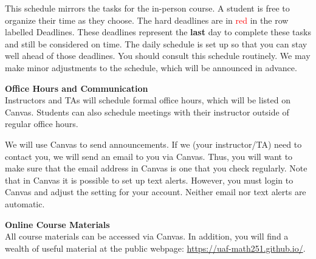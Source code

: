 \documentclass[12pt]{article}
\renewcommand{\emph}[1]{\textsf{\textbf{#1}}}
\newcommand{\localhead}[1]{\par\smallskip\textbf{#1}\nobreak\\}%
\def\heading#1{\localhead{\large\emph{#1}}}
\begin{document}
This schedule mirrors the tasks for the
in-person course. A student is free to organize their time as they choose. The hard deadlines are in
\textcolor{red}{red} in the row labelled Deadlines. These deadlines represent the \textbf{last} day to complete these tasks
and still be considered on time. The daily schedule is set up so that you can stay well ahead of
those deadlines. You should consult this schedule routinely. We may make minor adjustments to
the schedule, which will be announced in advance.

\heading{Office Hours and Communication}
Instructors and TAs will schedule formal office hours, which will be listed on Canvas. Students can also schedule meetings with their instructor outside of regular office hours.

We will use Canvas to send announcements. If we (your instructor/TA) need to contact you, we will send an email to you via Canvas. Thus, you will
want to make sure that the email address in Canvas is one that you check regularly. Note that in
Canvas it is possible to set up text alerts. However, you must login to Canvas and adjust the setting
for your account. Neither email nor text alerts are automatic.


\heading{Online Course Materials}
All course materials can be accessed via Canvas. In addition, you will find a wealth of useful material at the public webpage: \href{https://uaf-math251.github.io/}{https://uaf-math251.github.io/}.\\

\end{document}
